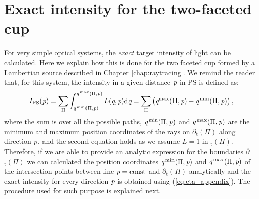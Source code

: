 \chapter{Exact intensity for the two-faceted cup}\label{app:boundariescup}
For very simple optical systems, the \textit{exact} target intensity of light can be calculated. Here we explain how this is done for the two faceted cup formed by a Lambertian source described in Chapter \ref{chap:raytracing}. We remind the reader that, for this system, the intensity in a given distance $\textit{p}$ in PS is defined as:
\begin{equation}\label{eq:eta_appendix}
I_{\textrm{PS}}(\textit{p}) = \sum_{\Pi}\int_{\textit{q}^\textrm{\,min}(\Pi, \textit{p})}^{\textit{q}^\textrm{\,max}(\Pi,\textit{p})}L(\textit{q}, \textit{p})\textrm{d}\textit{q} = \sum_{\Pi}\big (\textit{q}^\textrm{max}(\Pi,\textit{p})-\textit{q}^\textrm{\,min}(\Pi,\textit{p})\big )\,,
\end{equation}
where the sum is over all the possible paths, $\textit{q}^\textrm{\,min}(\Pi,\textit{p})$ and $\textit{q}^\textrm{\,max}(\Pi,\textit{p})$ are the minimum and maximum position coordinates of the rays on $\partial$$_\textrm{t}(\Pi)$ along direction $\textit{p}$, and the second equation holds as we assume $L=1$ in $_\textrm{t}(\Pi)$.
Therefore, if we are able to provide an analytic expression for the boundaries $\partial$$_\textrm{t}(\Pi)$ we can calculated the position coordinates $\textit{q}^\textrm{\,min}(\Pi,\textit{p})$ and $\textit{q}^\textrm{\,max}(\Pi,\textit{p})$ of the intersection points between line $\textit{p}=\textrm{const}$ and $\partial$$_\textrm{t}(\Pi)$ analytically and the exact intensity for every direction $\textit{p}$ is obtained using (\ref{eq:eta_appendix}). The procedure used for such purpose is explained next.
